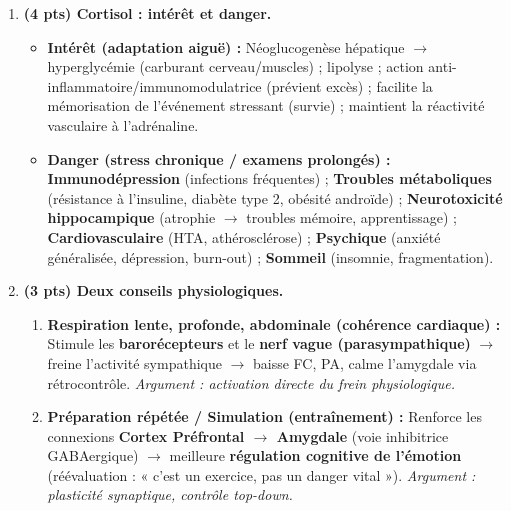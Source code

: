 \documentclass[11pt]{article}
\begin{document}
\begin{corrige}
\begin{enumerate}
\[
\text{Regards public (Stimulus)} \xrightarrow{\text{Récepteurs}} \text{Rétine} \xrightarrow{\text{Message nerveux}} \text{Nerf optique} \to \text{Thalamus} \to \textbf{Amygdale} \to \textbf{Hypothalamus} \to \textbf{Système nerveux sympathique (Moelle épinière, Ganglions)} \to \textbf{Médullosurrénale (Glande)} \xrightarrow{\text{Sang (Message hormonal)}} \textbf{Adrénaline} \to \text{Cibles (Cœur, Vaisseaux, Foie, Muscles)}
\]
\textit{Structures nerveuses citées (min 4) : Rétine, Nerf optique, Thalamus, Amygdale, Hypothalamus, Moelle épinière, Ganglions sympathiques. Glande : Médullosurrénale (Surrénale).}
\item \textbf{(4 pts) Cortisol : intérêt et danger.}
\begin{itemize}
\item \textbf{Intérêt (adaptation aiguë) :} Néoglucogenèse hépatique $\to$ hyperglycémie (carburant cerveau/muscles) ; lipolyse ; action anti-inflammatoire/immunomodulatrice (prévient excès) ; facilite la mémorisation de l'événement stressant (survie) ; maintient la réactivité vasculaire à l'adrénaline.
\item \textbf{Danger (stress chronique / examens prolongés) :} \textbf{Immunodépression} (infections fréquentes) ; \textbf{Troubles métaboliques} (résistance à l'insuline, diabète type 2, obésité androïde) ; \textbf{Neurotoxicité hippocampique} (atrophie $\to$ troubles mémoire, apprentissage) ; \textbf{Cardiovasculaire} (HTA, athérosclérose) ; \textbf{Psychique} (anxiété généralisée, dépression, burn-out) ; \textbf{Sommeil} (insomnie, fragmentation).
\end{itemize}
\item \textbf{(3 pts) Deux conseils physiologiques.}
\begin{enumerate}
\item \textbf{Respiration lente, profonde, abdominale (cohérence cardiaque) :} Stimule les \textbf{barorécepteurs} et le \textbf{nerf vague (parasympathique)} $\to$ freine l'activité sympathique $\to$ baisse FC, PA, calme l'amygdale via rétrocontrôle. \textit{Argument : activation directe du frein physiologique.}
\item \textbf{Préparation répétée / Simulation (entraînement) :} Renforce les connexions \textbf{Cortex Préfrontal $\to$ Amygdale} (voie inhibitrice GABAergique) $\to$ meilleure \textbf{régulation cognitive de l'émotion} (réévaluation : « c'est un exercice, pas un danger vital »). \textit{Argument : plasticité synaptique, contrôle top-down.}
\end{enumerate}

\end{enumerate}
\end{corrige}
\end{document}
